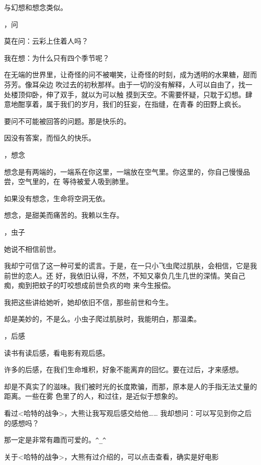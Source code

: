 \documentclass[12pt,a4paper]{article}
\newcommand{\subpart}[1]{
	\begingroup \par
	\vspace{1ex} \centering #1
	\par \endgroup
}
\begin{document}
		与幻想和想念类似。

	\endwriting



	\subpart{1，问}

		莫在问：云彩上住着人吗？

		我在想：为什么只有四个季节呢？

		在无端的世界里，让奇怪的问不被嘲笑，让奇怪的时刻，成为透明的水果糖，甜而芬芳。像耳朵边
	吹过去的初秋那样。由于一切的没有解释，人可以自由了，找一处楼顶仰卧，伸了双手，就以为可以触
	摸到天空。不需要怀疑，只耽于幻想。肆意地酣享着，属于我们的岁月，我们的狂妄，在指缝，在青春
	的田野上疯长。

		要问不可能被回答的问题。那是快乐的。

		因没有答案，而恒久的快乐。


	\subpart{2，想念}

		想念是有两端的，一端系在你这里，一端放在空气里。你这里的，你自己慢慢品尝，空气里的，在
	等待被爱人吸到肺里。

		如果没有想念，生命将空洞无依。

		想念，是甜美而痛苦的。我赖以生存。


	\subpart{3，虫子}

		她说不相信前世。

		我却宁可信了这一种可爱的谎言。于是，在一只小飞虫爬过肌肤，会相信，它是我前世的恋人。还
	好，我依旧认得，不然，不知又辜负几生几世的深情。笑自己痴，痴到把蚊子的叮咬想成前世负疚的吻
	来今生报偿。

		我把这些讲给她听，她却依旧不信，那些前世和今生。

		却是美妙的，不是么。小虫子爬过肌肤时，我能明白，那温柔。


	\subpart{4，后感}

		读书有读后感，看电影有观后感。

		许多的后感，在我们生命堆积，好象不能离弃的回忆。要在过后，才来感想。

		却是不真实了的滋味。我们被时光的长度欺骗，而那，原本是人的手指无法丈量的距离。一些在雾
	色里了的人，和过往，是近似于想象的。

		看过<哈特的战争>，大熊让我写观后感交给他…… 我却想问：可以写见到你之后的感想吗？

		那一定是非常有趣而可爱的。\verb|^_^|

		关于<哈特的战争>，大熊有过介绍的，可以点击查看，确实是好电影

\end{document}
